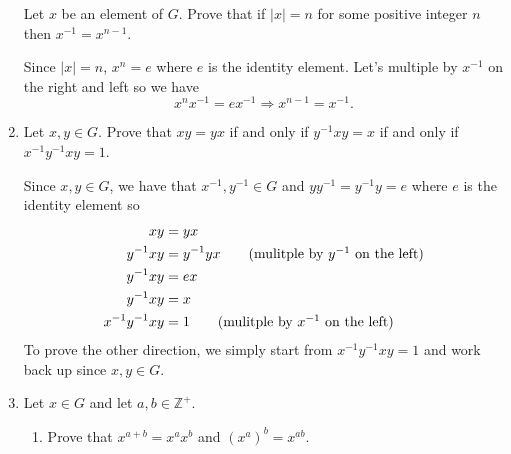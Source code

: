\begin{enumerate}
  Let \(x\) be an element of \(G\).
  Prove that if \(\lvert x\rvert = n\) for some positive integer \(n\) then
  \(x^{-1} = x^{n - 1}\).
  \par\smallskip
  Since \(\lvert x\rvert = n\), \(x^n = e\) where \(e\) is the identity
  element.
  Let's multiple by \(x^{-1}\) on the right and left so we have
  \[
  x^{n}x^{-1} = ex^{-1}\Rightarrow x^{n - 1} = x^{-1}.
  \]
\item
  Let \(x,y\in G\).
  Prove that \(xy = yx\) if and only if \(y^{-1}xy = x\) if and only if
  \(x^{-1}y^{-1}xy = 1\).
  \par\smallskip
  Since \(x,y\in G\), we have that \(x^{-1},y^{-1}\in G\) and
  \(yy^{-1} = y^{-1}y = e\) where \(e\) is the identity element so
  \begin{align*}
    xy & = yx\\
    y^{-1}xy & = y^{-1}yx\tag{mulitple by \(y^{-1}\) on the left}\\
    y^{-1}xy & = ex\\
    y^{-1}xy & = x\\
    x^{-1}y^{-1}xy & = 1\tag{mulitple by \(x^{-1}\) on the left}
  \end{align*}
  To prove the other direction, we simply start from \(x^{-1}y^{-1}xy = 1\) and
  work back up since \(x,y\in G\).
\item
  Let \(x\in G\) and let \(a,b\in\mathbb{Z}^+\).
  \begin{enumerate}[label = (\alph*), ref = \theenumi (\alph*)]
  \item
    \label{19a}
    Prove that \(x^{a + b} = x^ax^b\) and \((x^a)^b = x^{ab}\).
    \par\smallskip
    

\end{enumerate}
\end{enumerate}
